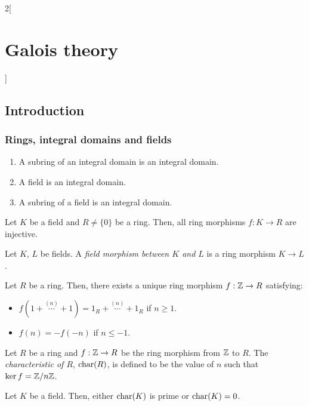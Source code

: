 \documentclass[../../../main.tex]{subfiles}
\begin{document}
\begin{multicols}{2}[\section{Galois theory}]
  \subsection{Introduction}
  \subsubsection{Rings, integral domains and fields}
  \begin{prop}
    \hfill
    \begin{enumerate}
      \item A subring of an integral domain is an integral domain.
      \item A field is an integral domain.
      \item A subring of a field is an integral domain.
    \end{enumerate}
  \end{prop}
  \begin{lemma}
    Let $K$ be a field and $R\ne\{0\}$ be a ring. Then, all ring morphisms $f:K\rightarrow R$ are injective.
  \end{lemma}
  \begin{definition}
    Let $K$, $L$ be fields. A \textit{field morphism between $K$ and $L$} is a ring morphism $K\rightarrow L$.
  \end{definition}
  \begin{lemma}
    Let $R$ be a ring. Then, there exists a unique ring morphism $f:\mathbb{Z}\rightarrow R$ satisfying:
    \begin{itemize}
      \item $f(1+\overset{(n)}{\cdots}+1)=1_R+\overset{(n)}{\cdots}+1_R$ if $n\geq 1$.
      \item $f(n)=-f(-n)$ if $n\leq -1$.
    \end{itemize}
  \end{lemma}
  \begin{definition}
    Let $R$ be a ring and $f:\mathbb{Z}\rightarrow R$ be the ring morphism from $\mathbb{Z}$ to $R$. The \textit{characteristic of $R$}, $\operatorname{char} (R)$, is defined to be the value of $n$ such that $\ker f=\quot{\ZZ}{n\ZZ}$.
  \end{definition}
  \begin{prop}
    Let $K$ be a field. Then, either $\operatorname{char}(K)$ is prime or $\operatorname{char}(K)=0$.

\end{prop}
\end{multicols}
\end{document}

